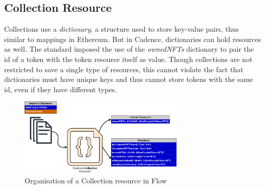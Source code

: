 \documentclass[../main.tex]{subfiles}
\begin{document}
\subsection{Collection Resource}
Collections use a \textit{dictionary}, a structure used to store key-value pairs, thus similar to mappings in Ethereum. But in Cadence, dictionaries can hold resources as well. The standard imposed the use of the \textit{ownedNFTs} dictionary to pair the id of a token with the token resource itself as value. Though collections are not restricted to save a single type of resources, this cannot violate the fact that dictionaries must have unique keys and thus cannot store tokens with the same id, even if they have different types.

\begin{figure}[htp]
    \centering
    \includegraphics[width=0.7\textwidth]{../Images/07_Cadence_Collection_Arch.png}
    \caption{Organisation of a Collection resource in Flow}
    \label{fig:cadence_collection_architecture}
\end{figure}
\end{document}
